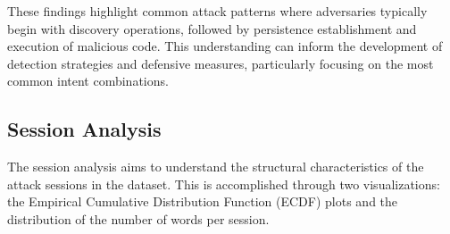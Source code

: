         These findings highlight common attack patterns where adversaries typically begin with discovery operations, followed by persistence establishment and execution of malicious code. This understanding can inform the development of detection strategies and defensive measures, particularly focusing on the most common intent combinations.
        
    \subsection{Session Analysis}

        The session analysis aims to understand the structural characteristics of the attack sessions in the dataset. This is accomplished through two visualizations: the Empirical Cumulative Distribution Function (ECDF) plots and the distribution of the number of words per session.


